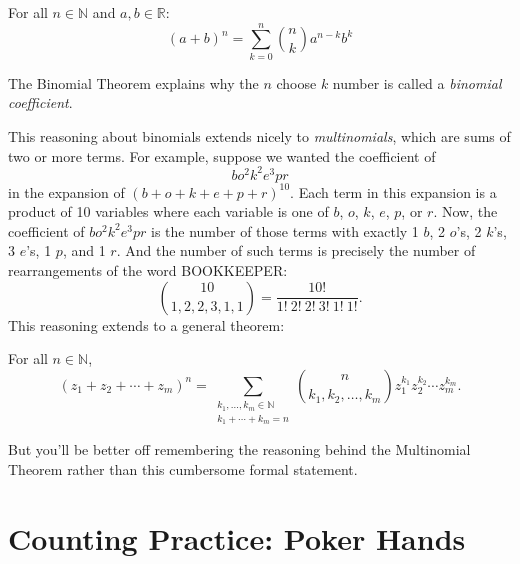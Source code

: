 \begin{theorem}\label{thm:binomial}
For all $n \in \mathbb{N}$ and $a, b \in \mathbb{R}$:
%
\[
(a + b)^n = \sum_{k=0}^n \binom{n}{k} a^{n-k} b^k
\]
\end{theorem}
The Binomial Theorem explains why the $n$ choose $k$ number is called
a%
\emph{binomial coefficient}.

This reasoning about binomials extends nicely to \emph{multinomials},
which are sums of two or more terms.  For example, suppose we wanted
the coefficient of
%
\[
b o^2 k^2 e^3 p r
\]
%
in the expansion of $(b + o + k + e + p + r)^{10}$.  Each term in this
expansion is a product of 10 variables where each variable is one of
$b$, $o$, $k$, $e$, $p$, or $r$.  Now, the coefficient of $b o^2 k^2
e^3 p r$ is the number of those terms with exactly 1 $b$, 2 $o$'s, 2
$k$'s, 3 $e$'s, 1 $p$, and 1 $r$.  And the number of such terms is
precisely the number of rearrangements of the word BOOKKEEPER:
\[
\binom{10}{1,2,2,3,1,1} = \frac{10!}{1!\ 2!\ 2!\ 3!\ 1!\ 1!}.
\]
This reasoning extends to a general theorem:
\begin{theorem}\label{multinom-thm}
For all $n \in \mathbb{N}$,
\[
(z_1 + z_2 + \cdots + z_m)^n =
   \sum_{\substack{k_1, \dots, k_m \in \mathbb{N} \\
                   k_1 + \cdots + k_m = n}}
   \binom{n}{k_1, k_2, \dots, k_m} z_1^{k_1} z_2^{k_2} \cdots z_m^{k_m}.
\]
\end{theorem}
But you'll be better off remembering the reasoning behind the Multinomial
Theorem rather than this cumbersome formal statement.

\begin{problems}

\practiceproblems
{}


\classproblems
{}

\homeworkproblems
{}

\examproblems
{}

\end{problems}


\section{Counting Practice: Poker Hands}\label{poker_hands_sec}

